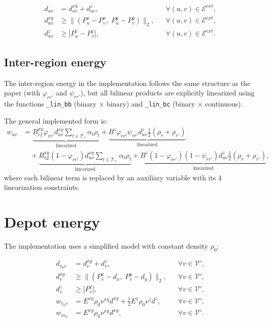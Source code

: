 \documentclass[12pt]{article}
\begin{document}
\begin{align}
  d_{uv} &= d_{uv}^{xy} + d_{uv}^z,
          && \forall (u,v)\in\mathcal E^{ext}, \tag{DIST3}\\
  d_{uv}^{xy} &\ge \|(P_u^x-P_v^x,\; P_u^y-P_v^y)\|_2,
          && \forall (u,v)\in\mathcal E^{ext}, \tag{DIST4 (SOC)}\\
  d_{uv}^z &\ge |P_u^z - P_v^z|,
          && \forall (u,v)\in\mathcal E^{ext}. \tag{DIST5-6}
\end{align}

\subsection*{Inter-region energy}

The inter-region energy in the implementation follows the same structure
as the paper (with $\varphi_{rr'}$ and $\psi_{rr'}$), but all
bilinear products are explicitly linearized using the functions
\texttt{\_lin\_bb} (binary $\times$ binary) and \texttt{\_lin\_bc}
(binary $\times$ continuous).

The general implemented form is:
\begin{align}
  w_{uv} &= \underbrace{B^{xy}_{r1} \varphi_{rr'} d_{uv}^{xy} 
           \sum_{t\in\mathcal T_r} \alpha_t \rho_t}_{\text{linearized}}
           + \underbrace{B^z \varphi_{rr'}\psi_{rr'} d_{uv}^z
           \tfrac12(\rho_r+\rho_{r'})}_{\text{linearized}} \nonumber\\
         &\quad + \underbrace{B^{xy}_{r2} (1-\varphi_{rr'}) d_{uv}^{xy}
           \sum_{t\in\mathcal T_{r'}} \alpha_t \rho_t}_{\text{linearized}}
           + \underbrace{B^z (1-\varphi_{rr'})(1-\psi_{rr'}) d_{uv}^z
           \tfrac12(\rho_r+\rho_{r'})}_{\text{linearized}}, \tag{INTER-ENER}
\end{align}
where each bilinear term is replaced by an auxiliary variable with its
4 linearization constraints.

\section{Depot energy}

The implementation uses a simplified model with constant density $\rho_0$:

\begin{align}
  d_{v_0 v} &= d_{v}^{xy} + d_v^z,
            && \forall v\in\mathcal V', \tag{DEP-DIST}\\
  d_{v}^{xy} &\ge \|(P_v^x - d_x,\; P_v^y - d_y)\|_2,
            && \forall v\in\mathcal V', \tag{DEP-SOC}\\
  d_v^z &\ge |P_v^z|,
            && \forall v\in\mathcal V', \tag{DEP-Z}\\
  w_{v_0 v} &= E^{xy}\rho_0 \nu^{xy} d^{xy} + \tfrac12 E^z \rho_0 \nu^z d^z,
            && \forall v\in\mathcal V', \tag{DEP-ENER}\\
  w_{v v_0} &= E^{xy}\rho_0 \nu^{xy} d^{xy},
            && \forall v\in\mathcal V'. \tag{DEP-ENER-S}
\end{align}
\end{document}
